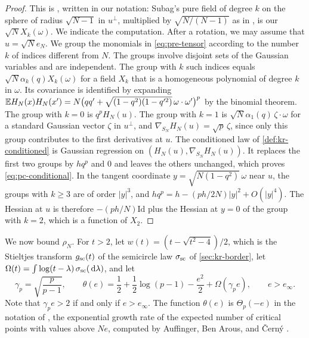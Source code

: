 \begin{proof}
This is \cite[Lemmas~14 and~15 and Corollary~17]{Subag2017geometry}, written in our notation: Subag's pure field of degree $k$ on the sphere of radius $\sqrt{N-1}$ in $u^\perp$, multiplied by $\sqrt{N/(N-1)}$ as in \cite[(4.11)]{Subag2017geometry}, is our $\sqrt NX_k(\omega)$. We indicate the computation. After a rotation, we may assume that $u=\sqrt Ne_N$. We group the monomials in \eqref{eq:pre-tensor} according to the number $k$ of indices different from $N$. The groups involve disjoint sets of the Gaussian variables and are independent. The group with $k$ such indices equals $\sqrt N\alpha_k(q)X_k(\omega)$ for a field $X_k$ that is a homogeneous polynomial of degree $k$ in $\omega$. Its covariance is identified by expanding $\mathbb E H_N(x)H_N(x')=N\bigl(qq'+\sqrt{(1-q^2)(1-q'^2)}\,\omega\cdot\omega'\bigr)^p$ by the binomial theorem. The group with $k=0$ is $q^pH_N(u)$. The group with $k=1$ is $\sqrt N\alpha_1(q)\,\zeta\cdot\omega$ for a standard Gaussian vector $\zeta$ in $u^\perp$, and $\nabla_{S_N}H_N(u)=\sqrt p\,\zeta$, since only this group contributes to the first derivatives at $u$. The conditioned law of \cref{def:kr-conditioned} is Gaussian regression on $(H_N(u),\nabla_{S_N}H_N(u))$. It replaces the first two groups by $hq^p$ and $0$ and leaves the others unchanged, which proves \eqref{eq:pc-conditional}. In the tangent coordinate $y=\sqrt{N(1-q^2)}\,\omega$ near $u$, the groups with $k\ge3$ are of order $|y|^3$, and $hq^p=h-(ph/2N)|y|^2+O(|y|^4)$. The Hessian at $u$ is therefore $-(ph/N)\mathrm{Id}$ plus the Hessian at $y=0$ of the group with $k=2$, which is a function of $X_2$.
\end{proof}

We now bound $\rho_N$. For $t>2$, let $w(t)=(t-\sqrt{t^2-4})/2$, which is the Stieltjes transform $g_{\rm sc}(t)$ of the semicircle law $\sigma_{\rm sc}$ of \cref{sec:kr-border}, let $\Omega(t)=\int\log(t-\lambda)\,\sigma_{\rm sc}(\,\mathrm d\lambda)$, and let
\[
\gamma_p=\sqrt{\frac p{p-1}},\qquad\theta(e)=\frac12+\frac12\log(p-1)-\frac{e^2}2+\Omega(\gamma_pe),\qquad e>e_\infty.
\]
Note that $\gamma_pe>2$ if and only if $e>e_\infty$. The function $\theta(e)$ is $\Theta_p(-e)$ in the notation of \cite[(2.5)]{SubagZeitouni2017}, the exponential growth rate of the expected number of critical points with values above $Ne$, computed by Auffinger, Ben Arous, and \v{C}ern\'y \cite{AuffingerBenArousCerny2013}.

